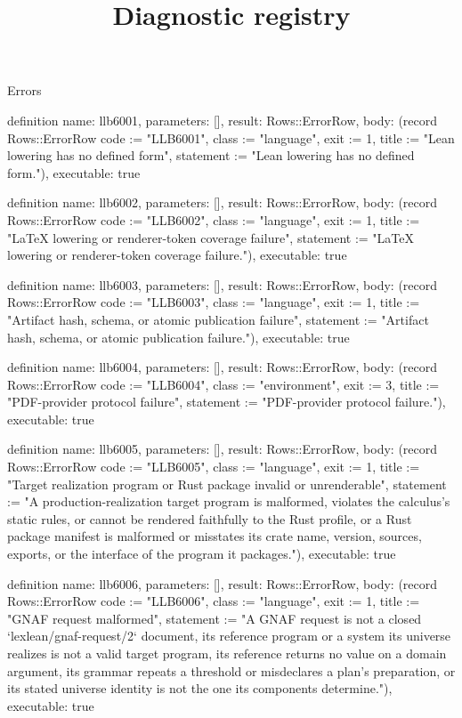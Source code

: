 \begin{lexlean}{Errors}
\title{Diagnostic registry}
\begin{semanticmodule}
definition{
  name: llb6001,
  parameters: [],
  result: Rows::ErrorRow,
  body: (record Rows::ErrorRow {code := "LLB6001", class := "language", exit := 1, title := "Lean lowering has no defined form", statement := "Lean lowering has no defined form."}),
  executable: true
}

definition{
  name: llb6002,
  parameters: [],
  result: Rows::ErrorRow,
  body: (record Rows::ErrorRow {code := "LLB6002", class := "language", exit := 1, title := "LaTeX lowering or renderer-token coverage failure", statement := "LaTeX lowering or renderer-token coverage failure."}),
  executable: true
}

definition{
  name: llb6003,
  parameters: [],
  result: Rows::ErrorRow,
  body: (record Rows::ErrorRow {code := "LLB6003", class := "language", exit := 1, title := "Artifact hash, schema, or atomic publication failure", statement := "Artifact hash, schema, or atomic publication failure."}),
  executable: true
}

definition{
  name: llb6004,
  parameters: [],
  result: Rows::ErrorRow,
  body: (record Rows::ErrorRow {code := "LLB6004", class := "environment", exit := 3, title := "PDF-provider protocol failure", statement := "PDF-provider protocol failure."}),
  executable: true
}

definition{
  name: llb6005,
  parameters: [],
  result: Rows::ErrorRow,
  body: (record Rows::ErrorRow {code := "LLB6005", class := "language", exit := 1, title := "Target realization program or Rust package invalid or unrenderable", statement := "A production-realization target program is malformed, violates the calculus's static rules, or cannot be rendered faithfully to the Rust profile, or a Rust package manifest is malformed or misstates its crate name, version, sources, exports, or the interface of the program it packages."}),
  executable: true
}

definition{
  name: llb6006,
  parameters: [],
  result: Rows::ErrorRow,
  body: (record Rows::ErrorRow {code := "LLB6006", class := "language", exit := 1, title := "GNAF request malformed", statement := "A GNAF request is not a closed `lexlean/gnaf-request/2` document, its reference program or a system its universe realizes is not a valid target program, its reference returns no value on a domain argument, its grammar repeats a threshold or misdeclares a plan's preparation, or its stated universe identity is not the one its components determine."}),
  executable: true
}


\end{semanticmodule}
\end{lexlean}
